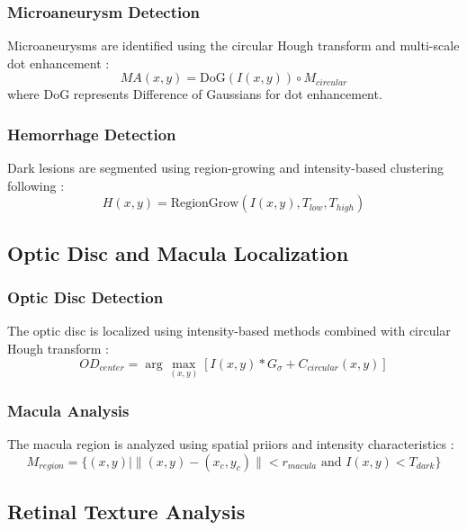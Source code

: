 \documentclass[12pt,a4paper]{article}
\begin{document}
\subsubsection{Microaneurysm Detection}
Microaneurysms are identified using the circular Hough transform and multi-scale dot enhancement \cite{zhang2010robust}:
\begin{equation}
MA(x,y) = \text{DoG}(I(x,y)) \circ M_{circular}
\end{equation}
where DoG represents Difference of Gaussians for dot enhancement.

\subsubsection{Hemorrhage Detection}
Dark lesions are segmented using region-growing and intensity-based clustering following \cite{sopharak2008automatic}:
\begin{equation}
H(x,y) = \text{RegionGrow}(I(x,y), T_{low}, T_{high})
\end{equation}

\subsection{Optic Disc and Macula Localization}

\subsubsection{Optic Disc Detection}
The optic disc is localized using intensity-based methods combined with circular Hough transform \cite{aquino2010detecting}:
\begin{equation}
OD_{center} = \arg\max_{(x,y)} \left[I(x,y) \ast G_{\sigma} + C_{circular}(x,y)\right]
\end{equation}

\subsubsection{Macula Analysis}
The macula region is analyzed using spatial priiors and intensity characteristics \cite{sinthanayothin1999automated}:
\begin{equation}
M_{region} = \{ (x,y) | \|(x,y) - (x_c,y_c)\| < r_{macula} \text{ and } I(x,y) < T_{dark} \}
\end{equation}

\subsection{Retinal Texture Analysis}
\end{document}
